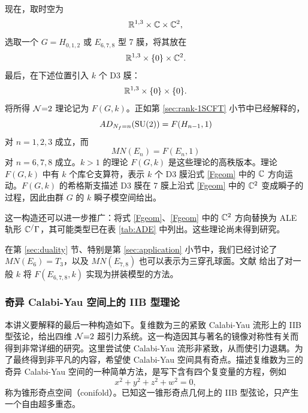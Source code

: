 现在，取时空为
\begin{equation}
\mathbb{R}^{1,3}\times\mathbb{C}\times\mathbb{C}^2,\label{Fgeom}
\end{equation}
选取一个 $G=H_{0,1,2}$ 或 $E_{6,7,8}$ 型 7 膜，将其放在
\begin{equation}
\mathbb{R}^{1,3}\times\{0\}\times\mathbb{C}^2.\label{Fgeomm}
\end{equation}
最后，在下述位置引入 $k$ 个 D3 膜：
\begin{equation}
\mathbb{R}^{1,3}\times\{0\}\times\{0\}.
\end{equation}
将所得 $\mathcal{N}{=}2$ 理论记为 $F(G,k)$。正如第 \ref{sec:rank-1SCFT} 小节中已经解释的，
\begin{equation}
AD_{N_f=n}(\mathop{\mathrm{SU}}(2))=F(H_{n-1},1)
\end{equation}
对 $n=1,2,3$ 成立，而
\begin{equation}
MN(E_n)=F(E_n,1)
\end{equation}
对 $n=6,7,8$ 成立。$k>1$ 的理论 $F(G,k)$ 是这些理论的高秩版本。理论 $F(G,k)$ 中有 $k$ 个库仑支算符，表示 $k$ 个 D3 膜沿式 \eqref{Fgeom} 中的 $\mathbb{C}$ 方向运动。$F(G,k)$ 的希格斯支描述 D3 膜在 7 膜上沿式 \eqref{Fgeom} 中的 $\mathbb{C}^2$ 变成瞬子的过程，因此由群 $G$ 的 $k$ 瞬子模空间给出。

这一构造还可以进一步推广：将式 \eqref{Fgeom}、\eqref{Fgeom} 中的 $\mathbb{C}^2$ 方向替换为 ALE 轨形 $\mathbb{C}^/\Gamma$，其可能类型已在表 \ref{tab:ADE} 中列出。这些理论尚未得到研究。

在第 \ref{sec:duality} 节、特别是第 \ref{sec:application} 小节中，我们已经讨论了 $MN(E_6)=T_3$，以及 $MN(E_{7,8})$ 也可以表示为三穿孔球面。文献 \cite{Benini:2009gi} 给出了对一般 $k$ 将 $F(E_{6,7,8},k)$ 实现为拼装模型的方法。

\subsubsection{奇异 Calabi-Yau 空间上的 IIB 型理论}
本讲义要解释的最后一种构造如下。复维数为三的紧致 Calabi-Yau 流形上的 IIB 型弦论，给出四维 $\mathcal{N}{=}2$ 超引力系统。这一构造因其与著名的镜像对称性有关而得到非常详细的研究。这里尝试使 Calabi-Yau 流形非紧致，从而使引力退耦。为了最终得到非平凡的内容，希望使 Calabi-Yau 空间具有奇点。描述复维数为三的奇异 Calabi-Yau 空间的一种简单方法，是写下含有四个复变量的方程，例如
\begin{equation}
x^2+y^2+z^2+w^2=0,\label{conifold}
\end{equation}
称为锥形奇点空间（conifold）。已知这一锥形奇点几何上的 IIB 型弦论，只产生一个自由超多重态。

